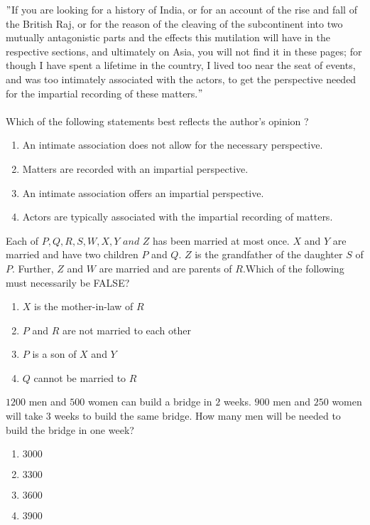     \item $"$If you are looking for a history of India, or for an account of the rise and fall of the British Raj, or for the reason of the cleaving of the subcontinent into two mutually antagonistic parts and the effects this mutilation will have in the respective sections, and ultimately on Asia, you will not find it in these pages; for though I have spent a lifetime in the country, I lived too near the seat of events, and was too intimately associated with the actors, to get the perspective needed for the impartial recording of these matters.$"$\\ \\
    Which of the following statements best reflects the author's opinion ?
    \begin{enumerate}
        \item An intimate association does not allow for the necessary perspective.
        \item Matters are recorded with an impartial perspective.
        \item An intimate association offers an impartial perspective.
        \item Actors are typically associated with the impartial recording of matters.
    \end{enumerate}
    \item Each of $P,Q,R,S,W,X,Y\,\,and\,\,Z$ has been married at most once. $X$ and $Y$ are married and have two children $P$ and $Q$. $Z$ is the grandfather of the daughter $S$ of $P$. Further,  $Z$ and $W$ are married and are parents of $R$.Which of the following must necessarily be FALSE?
    \begin{enumerate}
        \item $X$ is the mother-in-law of $R$
        \item $P$ and $R$ are not married to each other
        \item $P$ is a son of $X$ and $Y$
        \item $Q$ cannot be married to $R$
    \end{enumerate}
    \item $1200$ men and $500$ women can build a bridge in $2$ weeks. $900$ men and $250$ women will take $3$ weeks to build the same bridge. How many men will be needed to build the bridge in one week?
    \begin{enumerate}
        \item $3000$
        \item $3300$
        \item $3600$
        \item $3900$
    \end{enumerate}
